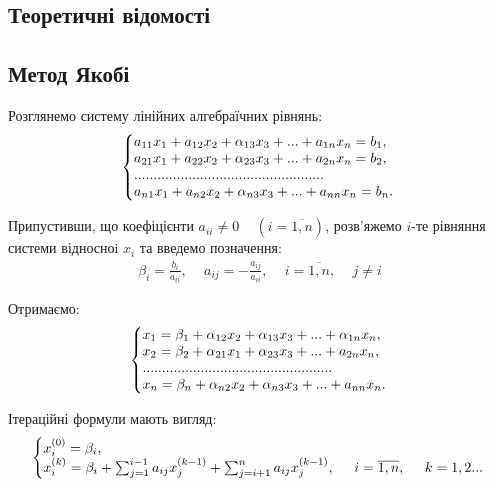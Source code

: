 \documentclass{article}
\begin{document}
\begin{large}
		\section*{Теоретичні відомості}
		\subsection*{Метод Якобі}
		Розглянемо систему лінійних алгебраїчних рівнянь:
		\begin{gather}
			\left\{\begin{array}{@{}l@{}}
				a_{11}x_1 + a_{12}x_2 + \alpha_{13}x_3 + ... + a_{1n}x_n = b_{1},\\\nonumber
				a_{21}x_1 + a_{22}x_2 + \alpha_{23}x_3 + ... + a_{2n}x_n = b_{2},\\\nonumber
				.................................................\\\nonumber
				a_{n1}x_1 + a_{n2}x_2 + \alpha_{n3}x_3 + ... + a_{nn}x_n = b_{n}.\nonumber
			\end{array}\right.\,
		\end{gather}
	
		Припустивши, що коефіцієнти $a_{ii}\ne0\hspace{14pt}(i=\overline{1,n})$, розв’яжемо $i$-те рівняння системи відносноi $x_i$ та введемо позначення:
		\begin{gather}
			\beta_i=\frac{b_i}{a_{ii}}, \hspace{14pt}a_{ij}=-\frac{a_{ij}}{a_{ii}}, \hspace{14pt}i=\overline{1,n}, \hspace{14pt}j\ne i\nonumber
		\end{gather}
	
		Отримаємо:
		\begin{gather}
			\left\{\begin{array}{@{}l@{}}
				x_1 = \beta_1 + \alpha_{12}x_2 + \alpha_{13}x_3+ ... + \alpha_{1n}x_n,\\\nonumber
				x_2 = \beta_2 + \alpha_{21}x_1 + \alpha_{23}x_3 + ... + a_{2n}x_n,\\\nonumber
				.................................................\\\nonumber
				x_n = \beta_n + \alpha_{n2}x_2 + \alpha_{n3}x_3 + ... + a_{nn}x_n.\nonumber
			\end{array}\right.\,
		\end{gather}
	
		Ітераційні формули мають вигляд:
		\begin{gather}
			\left\{\begin{array}{@{}l@{}}
				x_i^{(0)}=\beta_i,\\\nonumber
				x_i^{(k)}=\beta_i+\sum_{j=1}^{i-1}a_{ij}x_j^{(k-1)}+\sum_{j=i+1}^{n}a_{ij}x_j^{(k-1)},\hspace{14pt}i=\overline{1,n}, \hspace{14pt}k=1,2...\nonumber
			\end{array}\right.\,
		\end{gather}
	

\end{large}
\end{document}
